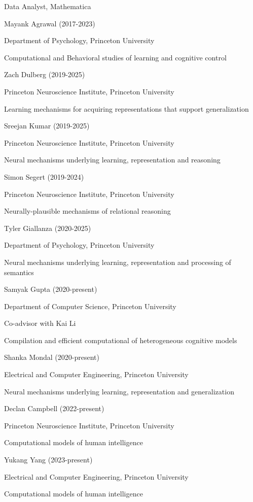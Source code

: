 \documentclass[10 pt]{article}
\begin{document}
Data Analyst, Mathematica
    \medskip

Mayank Agrawal (2017-2023)

Department of Psychology, Princeton University

Computational and Behavioral studies of learning and cognitive control
    \medskip

Zach Dulberg (2019-2025)

Princeton Neuroscience Institute, Princeton University

Learning mechanisms for acquiring representations that support generalization
    \medskip

Sreejan Kumar (2019-2025)

Princeton Neuroscience Institute, Princeton University

Neural mechanisms underlying learning, representation and reasoning
    \medskip

Simon Segert (2019-2024)

Princeton Neuroscience Institute, Princeton University

Neurally-plausible mechanisms of relational reasoning
    \medskip

Tyler Giallanza (2020-2025)

Department of Psychology, Princeton University

Neural mechanisms underlying learning, representation and processing of semantics
    \medskip

Samyak Gupta (2020-present)

Department of Computer Science, Princeton University

Co-advisor with Kai Li

Compilation and efficient computational of heterogeneous cognitive models
    \medskip

Shanka Mondal (2020-present)

Electrical and Computer Engineering, Princeton University

Neural mechanisms underlying learning, representation and generalization
    \medskip

Declan Campbell (2022-present)

Princeton Neuroscience Institute, Princeton University

Computational models of human intelligence
    \medskip

Yukang Yang (2023-present)

Electrical and Computer Engineering, Princeton University

Computational models of human intelligence
    \medskip
\end{document}
